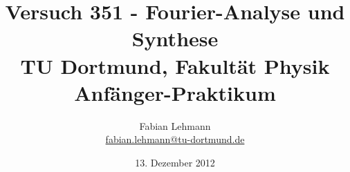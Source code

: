 ﻿%


\renewcommand*\rmdefault{iwona}\normalfont\upshape


\title{Versuch 351 - Fourier-Analyse und Synthese\\				%
\large TU Dortmund, Fakultät Physik\\ 
\normalsize Anfänger-Praktikum}


\author{Fabian Lehmann\\					%
{\small \href{fabian.lehmann@tu-dortmund.de}{fabian.lehmann@tu-dortmund.de}}		%
}

\date{13. Dezember 2012}%





\maketitle					%
\thispagestyle{empty} 				%



